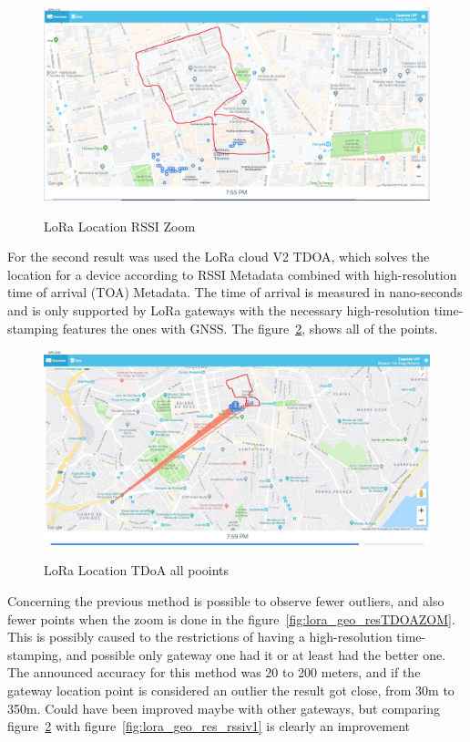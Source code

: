\begin{figure}[htbp]
  \centering
  
    {\includegraphics[width=0.8\linewidth]{Chapters/Figures/lorageores21-1.PNG}}%
 
  \caption{LoRa Location RSSI Zoom}
  \label{fig:lora_geo_res_RSSIV1_Zoom}
\end{figure}





For the second result was used the LoRa cloud V2 TDOA, which solves the location for a device according to RSSI Metadata combined with high-resolution time of arrival (TOA) Metadata. The time of arrival is measured in nano-seconds and is only supported by LoRa gateways with the necessary high-resolution time-stamping features the ones with GNSS. The figure~\ref{fig:lora_geo_resTDOA1}, shows all of the points.
\begin{figure}[htbp]
  \centering
  
    {\includegraphics[width=0.8\linewidth]{Chapters/Figures/lorageores25-2.jpg}}%
 
  \caption{LoRa Location TDoA all pooints}
  \label{fig:lora_geo_resTDOA1}
\end{figure}

Concerning the previous method is possible to observe fewer outliers, and also fewer points when the zoom is done in the figure~\ref{fig:lora_geo_resTDOAZOM}. This is possibly caused to the restrictions of having a high-resolution time-stamping, and possible only gateway one had it or at least had the better one. The announced accuracy for this method was 20 to 200 meters, and if the gateway location point is considered an outlier the result got close, from 30m to 350m. Could have been improved maybe with other gateways, but comparing figure~\ref{fig:lora_geo_resTDOA1} with figure~\ref{fig:lora_geo_res_rssiv1} is clearly an improvement 

